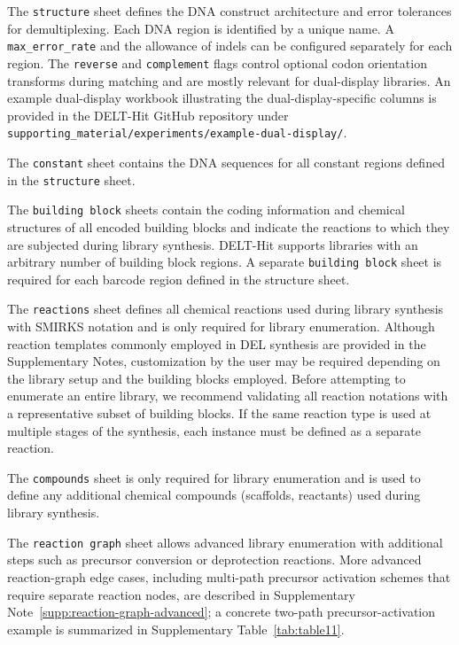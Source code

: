 The \texttt{structure} sheet defines the DNA construct architecture and error tolerances for demultiplexing. Each DNA region is identified by a unique name. A \texttt{max\_error\_rate} and the allowance of indels can be configured separately for each region. The \texttt{reverse} and \texttt{complement} flags control optional codon orientation transforms during matching and are mostly relevant for dual-display libraries. An example dual-display workbook illustrating the dual-display-specific columns is provided in the DELT-Hit GitHub repository under \texttt{supporting\_material/experiments/example-dual-display/}. 

The \texttt{constant} sheet contains the DNA sequences for all constant regions defined in the \texttt{structure} sheet. 

The \texttt{building block} sheets contain the coding information and chemical structures of all encoded building blocks and indicate the reactions to which they are subjected during library synthesis. DELT-Hit supports libraries with an arbitrary number of building block regions. A separate \texttt{building block} sheet is required for each barcode region defined in the structure sheet. 

The \texttt{reactions} sheet defines all chemical reactions used during library synthesis with SMIRKS notation\cite{ref34} and is only required for library enumeration. Although reaction templates commonly employed in DEL synthesis are provided in the Supplementary Notes, customization by the user may be required depending on the library setup and the building blocks employed. Before attempting to enumerate an entire library, we recommend validating all reaction notations with a representative subset of building blocks. If the same reaction type is used at multiple stages of the synthesis, each instance must be defined as a separate reaction.

The \texttt{compounds} sheet is only required for library enumeration and is used to define any additional chemical compounds (scaffolds, reactants) used during library synthesis. 

The \texttt{reaction graph} sheet allows advanced library enumeration with additional steps such as precursor conversion or deprotection reactions. More advanced reaction-graph edge cases, including multi-path precursor activation schemes that require separate reaction nodes, are described in Supplementary Note~\ref{supp:reaction-graph-advanced}; a concrete two-path precursor-activation example is summarized in Supplementary Table~\ref{tab:table11}. 


